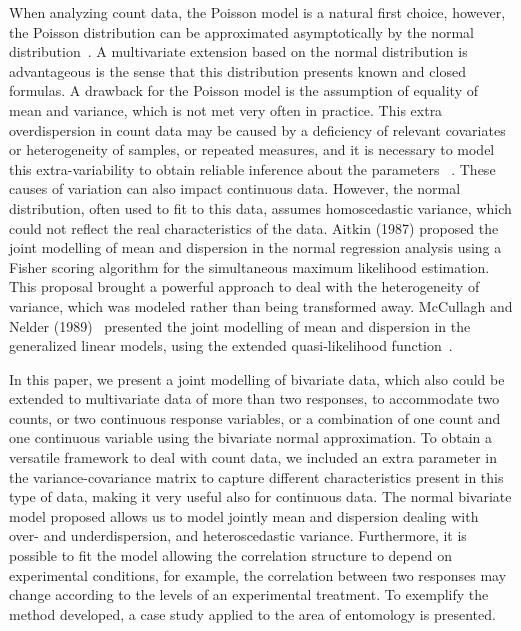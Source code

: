 \documentclass[useAMS,referee]{biom}
\begin{document}
When analyzing count data, the Poisson model is a natural first choice, however, the Poisson distribution can be approximated asymptotically by the normal distribution~\citep{mood1950introduction}. A multivariate extension based on the normal distribution is advantageous is the sense that this distribution presents known and closed formulas.  A drawback for the Poisson model is the assumption of equality of mean and variance, which is not met very often in practice. This extra overdispersion in count data may be caused by a deficiency of relevant covariates or heterogeneity of samples, or repeated measures, and it is necessary to model this extra-variability to obtain reliable inference about the parameters ~\citep{hinde1998overdispersion,ver2007quasi}. These causes of variation can also impact continuous data. However, the normal distribution, often used to fit to this data,  assumes homoscedastic variance, which could not reflect the real characteristics of the data.  Aitkin (1987) proposed the joint modelling of mean and dispersion in the normal regression analysis using a Fisher scoring algorithm for the simultaneous maximum likelihood estimation. This proposal brought a powerful approach to deal with the heterogeneity of variance, which was modeled rather than being transformed away. McCullagh and Nelder (1989)~\nocite{mccullagh1989generalized} presented the joint modelling of mean and dispersion in the generalized linear models, using the extended quasi-likelihood function~\citep{nelder1987extended}. 





In this paper, we present a joint modelling of bivariate data, which also could be extended to multivariate data of more than two responses, to accommodate two counts, or two continuous response variables, or a combination of one count and one continuous variable using the bivariate normal approximation.  To obtain a versatile framework to deal with count data, we included an extra parameter in the variance-covariance matrix to capture different characteristics present in this type of data, making it very useful also for continuous data.  The normal bivariate model proposed allows us to model jointly mean and dispersion dealing with over- and underdispersion, and heteroscedastic variance. Furthermore, it is possible to fit the model allowing the correlation structure to depend on experimental conditions, for example, the correlation between two responses may change according to the levels of an experimental treatment. To exemplify the method developed, a case study applied to the area of entomology is presented.
\end{document}

